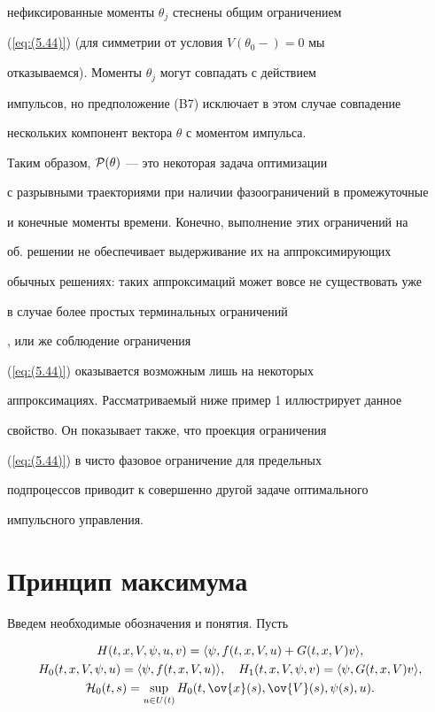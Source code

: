 нефиксированные моменты $\theta_j$ стеснены общим ограничением


(\ref{eq:(5.44)}) (для симметрии от условия $V(\theta_0-)=0$ мы


отказываемся). Моменты $\theta_j$ могут совпадать с действием


импульсов, но предположение (B7) исключает в этом случае совпадение


нескольких компонент вектора $\theta$ с моментом импульса.


\medskip





Таким образом, ${\cal P}(\theta)$ --- это некоторая задача оптимизации


с разрывными траекториями при наличии фазоограничений в промежуточные


и конечные моменты времени. Конечно, выполнение этих ограничений на


об. решении не обеспечивает выдерживание их на аппроксимирующих


обычных решениях: таких аппроксимаций может вовсе не существовать уже


в случае более простых терминальных ограничений


\cite{Diz.vuz}, \cite{DIFAC} или же соблюдение ограничения


(\ref{eq:(5.44)}) оказывается возможным лишь на некоторых


аппроксимациях. Рассматриваемый ниже пример 1 иллюстрирует данное


свойство. Он показывает также, что проекция ограничения


(\ref{eq:(5.44)}) в чисто фазовое ограничение для предельных


подпроцессов приводит к совершенно другой задаче оптимального


импульсного управления.





\section{Принцип максимума}





Введем необходимые обозначения и понятия. Пусть


\begin{gather*}


H(t,x,V,\psi,u,v )=\langle \psi,f(t,x,V,u)+G(t,x,V)v\rangle ,\\


H_{0}(t,x,V,\psi,u )=\langle \psi,f(t,x,V,u)\rangle ,\quad


H_1(t,x,V,\psi,v)=\langle \psi,G(t,x,V)v\rangle, \\


{\cal H}_0(t,s)= \sup_{u \in U(t)}


H_0(t,\ov{x}(s),\ov{ V}(s),\psi(s),u).


\end{gather*}





